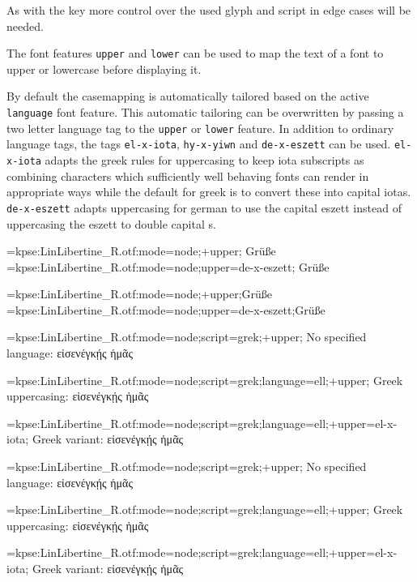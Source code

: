    As with the  key more control over the used glyph and script in edge cases will be needed.
   \endaltitem

   The\label{upperlower}
   font features \texttt{upper} and \texttt{lower} can be used to map
   the text of a font to upper or lowercase before displaying it.

   By default the casemapping is automatically tailored based on the active
   \texttt{language} font feature. This automatic tailoring can be overwritten
   by passing a two letter language tag to the \texttt{upper} or \texttt{lower}
   feature. In addition to ordinary language tags, the tags \texttt{el-x-iota},
   \texttt{hy-x-yiwn} and \texttt{de-x-eszett} can be used. \texttt{el-x-iota}
   adapts the greek rules for uppercasing to keep iota subscripts as combining
   characters which sufficiently well behaving fonts can render in appropriate
   ways while the default for greek is to convert these into capital iotas.
   \texttt{de-x-eszett} adapts uppercasing for german to use the capital eszett
   instead of uppercasing the eszett to double capital s.

   \beginlisting
   \font\test={kpse:LinLibertine_R.otf:mode=node;+upper;}
   \test Grüße
   \font\test={kpse:LinLibertine_R.otf:mode=node;upper=de-x-eszett;}
   \test Grüße
   \endlisting

   {\Large
     \font\test={kpse:LinLibertine\string_R.otf:mode=node;+upper;}\test Grüße
     \font\test={kpse:LinLibertine\string_R.otf:mode=node;upper=de-x-eszett;}\test Grüße
   }

   \beginlisting
   \font\test={kpse:LinLibertine_R.otf:mode=node;script=grek;+upper;}
   No specified language: {\test εἰσενέγκῄς ἡμᾶς}\par
   \font\test={kpse:LinLibertine_R.otf:mode=node;script=grek;language=ell;+upper;}
   Greek uppercasing: {\test εἰσενέγκῄς ἡμᾶς}\par
   \font\test={kpse:LinLibertine_R.otf:mode=node;script=grek;language=ell;+upper=el-x-iota;}
   Greek variant: {\test εἰσενέγκῄς ἡμᾶς}\par
   \endlisting

   {%
     \font\test={kpse:LinLibertine\string_R.otf:mode=node;script=grek;+upper;}
     No specified language: {\test εἰσενέγκῄς ἡμᾶς}\par
     \font\test={kpse:LinLibertine\string_R.otf:mode=node;script=grek;language=ell;+upper;}
     Greek uppercasing: {\test εἰσενέγκῄς ἡμᾶς}\par
     \font\test={kpse:LinLibertine\string_R.otf:mode=node;script=grek;language=ell;+upper=el-x-iota;}
     Greek variant: {\test εἰσενέγκῄς ἡμᾶς}\par
   }


